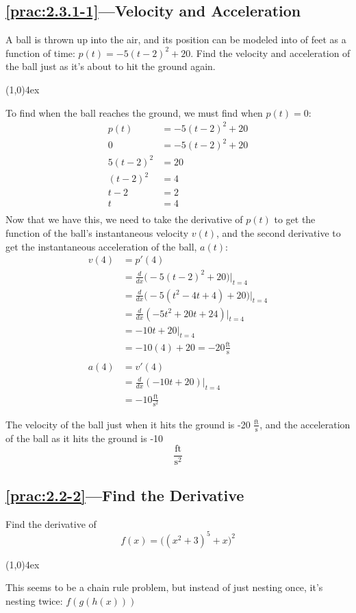 \documentclass{MathNotes}
\newcommand{\br}{
\begin{center}
\line(1,0){4ex}
\end{center}}
\begin{document}
\subsection*{\ref{prac:2.3.1-1}---Velocity and Acceleration}\label{ans:2.3.1-1}
A ball is thrown up into the air, and its position can be modeled into
of feet as a function of time: $p(t)=-5(t-2)^2+20$. Find the velocity and
acceleration of the ball just as it's about to hit the ground again.
\br
To find when the ball reaches the ground, we must find when $p(t)=0$:
\begin{align*}
    p(t)&=-5(t-2)^2+20\\
       0&=-5(t-2)^2+20\\
    5(t-2)^2&=20\\
    (t-2)^2&=4\\
    t-2&=2\\
    t&=4\\
\end{align*}
Now that we have this, we need to take the derivative of $p(t)$ to get the
function of the ball's instantaneous velocity $v(t)$, and the second derivative
to get the instantaneous acceleration of the ball, $a(t)$:
\begin{align*}
    v(4)&=p'(4)\\
    &=\frac{d}{dx}\big(-5(t-2)^2+20\big)\Big|_{t=4}\\
    &=\frac{d}{dx}\big(-5(t^2-4t+4)+20\big)\Big|_{t=4}\\
    &=\frac{d}{dx}(-5t^2+20t+24)\Big|_{t=4}\\
    &=-10t+20\Big|_{t=4}\\
    &=-10(4)+20=-20\frac{\text{ft}}{\text{s}}\\
    \\
    a(4)&=v'(4)\\
    &=\frac{d}{dx}(-10t+20)\Big|_{t=4}\\
    &=-10\frac{\text{ft}}{\text{s}^2}
\end{align*}

The velocity of the ball just when it hits the ground is -20 
$\displaystyle\frac{\text{ft}}{\text{s}}$, and the acceleration of the ball as 
it hits the ground is -10 $$\frac{\text{ft}}{\text{s}^2}$$

\subsection*{\ref{prac:2.2-2}---Find the Derivative}\label{ans:2.2-2}
Find the derivative of $$f(x)=\big((x^2+3)^5+x\big)^2$$
\br
This seems to be a chain rule problem, but instead of just nesting once,
it's nesting twice: $f(g(h(x)))$
\end{document}
